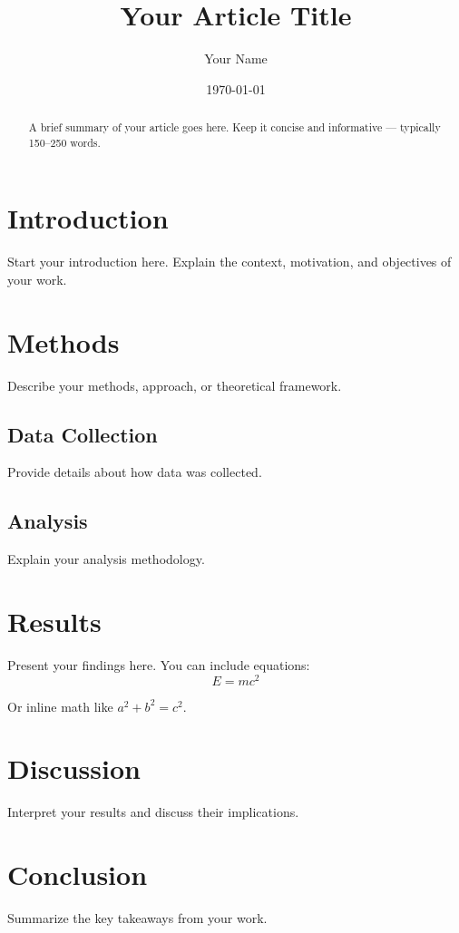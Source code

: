 \documentclass[12pt]{article}
\title{Your Article Title}
\author{Your Name}
\date{\today}
\begin{document}
\maketitle

\begin{abstract}
  A brief summary of your article goes here. Keep it concise
  and informative --- typically 150--250 words.
\end{abstract}

\tableofcontents

\section{Introduction}

Start your introduction here. Explain the context, motivation,
and objectives of your work.

\section{Methods}

Describe your methods, approach, or theoretical framework.

\subsection{Data Collection}

Provide details about how data was collected.

\subsection{Analysis}

Explain your analysis methodology.

\section{Results}

Present your findings here. You can include equations:
\begin{equation}
  E = mc^2
\end{equation}

Or inline math like $a^2 + b^2 = c^2$.

\section{Discussion}

Interpret your results and discuss their implications.

\section{Conclusion}

Summarize the key takeaways from your work.
\end{document}
